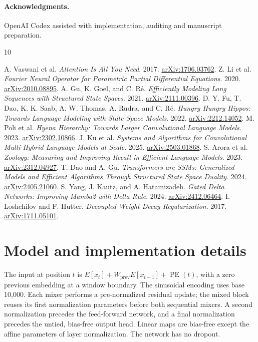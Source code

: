 \documentclass[11pt,letterpaper]{article}
\begin{document}
\paragraph{Acknowledgments.}
OpenAI Codex assisted with implementation, auditing and manuscript preparation.
\label{main:last}
\clearpage

\begin{thebibliography}{10}\small\raggedright
{} A. Vaswani et al. \emph{Attention Is All You Need}. 2017. \href{https://arxiv.org/abs/1706.03762}{arXiv:1706.03762}.
 Z. Li et al. \emph{Fourier Neural Operator for Parametric Partial Differential Equations}. 2020. \href{https://arxiv.org/abs/2010.08895}{arXiv:2010.08895}.
 A. Gu, K. Goel, and C. R\'e. \emph{Efficiently Modeling Long Sequences with Structured State Spaces}. 2021. \href{https://arxiv.org/abs/2111.00396}{arXiv:2111.00396}.
 D. Y. Fu, T. Dao, K. K. Saab, A. W. Thomas, A. Rudra, and C. R\'e. \emph{Hungry Hungry Hippos: Towards Language Modeling with State Space Models}. 2022. \href{https://arxiv.org/abs/2212.14052}{arXiv:2212.14052}.
 M. Poli et al. \emph{Hyena Hierarchy: Towards Larger Convolutional Language Models}. 2023. \href{https://arxiv.org/abs/2302.10866}{arXiv:2302.10866}.
 J. Ku et al. \emph{Systems and Algorithms for Convolutional Multi-Hybrid Language Models at Scale}. 2025. \href{https://arxiv.org/abs/2503.01868}{arXiv:2503.01868}.
 S. Arora et al. \emph{Zoology: Measuring and Improving Recall in Efficient Language Models}. 2023. \href{https://arxiv.org/abs/2312.04927}{arXiv:2312.04927}.
 T. Dao and A. Gu. \emph{Transformers are SSMs: Generalized Models and Efficient Algorithms Through Structured State Space Duality}. 2024. \href{https://arxiv.org/abs/2405.21060}{arXiv:2405.21060}.
 S. Yang, J. Kautz, and A. Hatamizadeh. \emph{Gated Delta Networks: Improving Mamba2 with Delta Rule}. 2024. \href{https://arxiv.org/abs/2412.06464}{arXiv:2412.06464}.
 I. Loshchilov and F. Hutter. \emph{Decoupled Weight Decay Regularization}. 2017. \href{https://arxiv.org/abs/1711.05101}{arXiv:1711.05101}.
\end{thebibliography}

\clearpage
\appendix
\section{Model and implementation details}\label{app:methods}
The input at position $t$ is $E[x_t]+W_{\mathrm{prev}}E[x_{t-1}]+\operatorname{PE}(t)$, with a zero previous embedding at a window boundary. The sinusoidal encoding uses base 10,000. Each mixer performs a pre-normalized residual update; the mixed block reuses its first normalization parameters before both sequential mixers. A second normalization precedes the feed-forward network, and a final normalization precedes the untied, bias-free output head. Linear maps are bias-free except the affine parameters of layer normalization. The network has no dropout.
\end{document}
